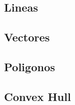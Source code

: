 \subsection{Lineas}
\raggedbottom
\hrulefill
\subsection{Vectores}
\raggedbottom
\hrulefill
\subsection{Poligonos}
\raggedbottom
\hrulefill
\subsection{Convex Hull}
\raggedbottom
\hrulefill

